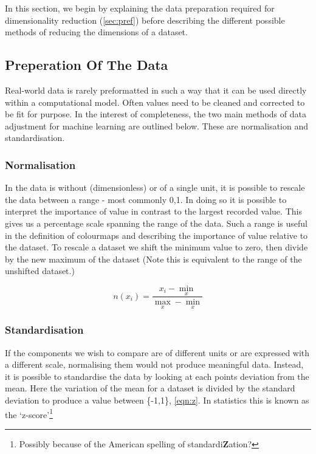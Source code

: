 In this section, we begin by explaining the data preparation required for dimensionality reduction (\autoref{sec:pref}) before describing the different possible methods of reducing the dimensions of a dataset.

\subsection{Preperation Of The Data}\label{sec:prep}
Real-world data is rarely preformatted in such a way that it can be used directly within a computational model. Often values need to be cleaned and corrected to be fit for purpose. In the interest of completeness, the two main methods of data adjustment for machine learning are outlined below. These are normalisation and standardisation.


\subsubsection*{Normalisation}
In the data is without (dimensionless) or of a single unit, it is possible to rescale the data between a range - most commonly {0,1}. In doing so it is possible to interpret the importance of value in contrast to the largest recorded value. This gives us a percentage scale spanning the range of the data. Such a range is useful in the definition of colourmaps and describing the importance of value relative to the dataset.
To rescale a dataset we shift the minimum value to zero, then divide by the new maximum of the dataset (Note this is equivalent to the range of the unshifted dataset.)

\begin{equation}
    n(x_i) = \frac{x_i - \min_x }{\max_x - \min_x}
    \label{eqn:n}
\end{equation}



\subsubsection*{Standardisation}
If the components we wish to compare are of different units or are expressed with a different scale, normalising them would not produce meaningful data. Instead, it is possible to standardise the data by looking at each points deviation from the mean. Here the variation of the mean for a dataset is divided by the standard deviation to produce a value between \{-1,1\}, \autoref{eqn:z}. In statistics this is known as the `z-score'\footnote{Possibly because of the American spelling of standardi\textbf{Z}ation?}


